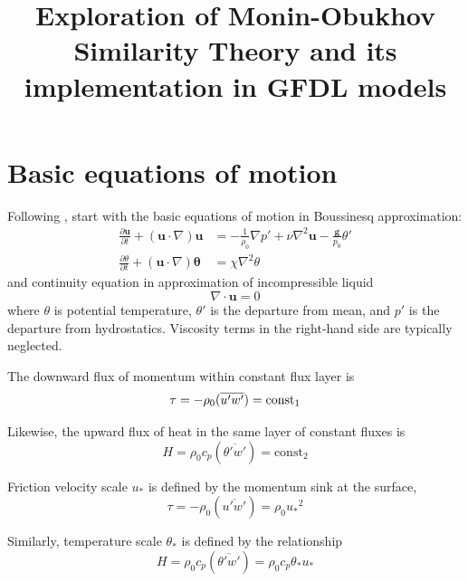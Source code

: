 \documentclass{article}
\title{Exploration of Monin-Obukhov Similarity Theory and its implementation in GFDL models}
\newcommand{\pderiv}[2]{\frac{\partial #1}{\partial #2}} %
\newcommand{\pt}{\theta} %
\newcommand{\ustar}{\ensuremath{u_*}} %
\newcommand{\tstar}{\ensuremath{\pt_*}} %
\begin{document}
\maketitle

\listoffigures
\tableofcontents

\section{Basic equations of motion}

Following \cite{Monin1971}, start with the basic equations of motion in Boussinesq approximation:
\begin{subequations}
\begin{align} \label{eq:boussinesq}
   \pderiv{\bm{u}}{t} + (\bm{u} \cdot \nabla) \bm{u} & = -\frac{1}{\rho_0}\nabla{p'} + \nu \nabla^2 \bm{u} - \frac{\bm{g}}{p_0}\pt' \\
   \pderiv{\pt}{t} + (\bm{u} \cdot \nabla) \bm{\pt} & =  \chi\nabla^2 \pt
\end{align}
\end{subequations}
and continuity equation in approximation of incompressible liquid
\begin{equation}
   \nabla \cdot \bm{u} = 0
\end{equation}
where $\pt$ is potential temperature, $\pt'$ is the departure from mean, and $p'$ is the departure from hydrostatics.
Viscosity terms in the right-hand side are typically neglected.

The downward flux of momentum within constant flux layer is
\begin{equation}
   \tau = - \rho_0 (\overline{u'w'}) = \text{const}_1 \\
\end{equation}

Likewise, the upward flux of heat in the same layer of constant fluxes is
\begin{equation}
   H = \rho_0 c_p (\overline{\pt'w'}) = \text{const}_2
\end{equation}

Friction velocity scale $\ustar$ is defined by the momentum sink at the surface,
\begin{equation}
   \tau = - \rho_0 (\overline{u'w'}) = \rho_0 \ustar^2
\end{equation}

Similarly, temperature scale $\tstar$ is defined by the relationship
\begin{equation}
   H = \rho_0 c_p (\overline{\pt'w'}) = \rho_0 c_p \tstar \ustar
\end{equation}
\end{document}
